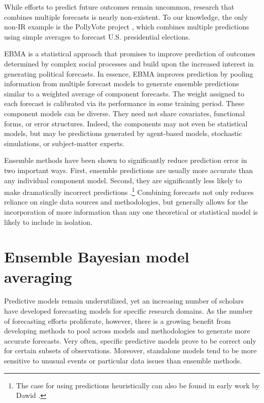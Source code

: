 \documentclass[pdftex,12pt,fullpage,oneside]{amsart}
\begin{document}
While efforts to predict future outcomes remain uncommon, research
that combines multiple forecasts is nearly non-existent.  To our
knowledge, the only non-IR example is the PollyVote project
\citep[c.f.][]{Graefe:2010}, which combines multiple predictions using
simple averages to forecast U.S. presidential elections.

EBMA is a statistical approach that promises to improve prediction of
outcomes determined by complex social processes and build upon the
increased interest in generating political forecasts. In essence, EBMA
improves prediction by pooling information from multiple forecast
models to generate ensemble predictions similar to a weighted average
of component forecasts. The weight assigned to each forecast is
calibrated via its performance in some training period.  These
component models can be diverse.  They need not share covariates,
functional forms, or error structures. Indeed, the components may not
even be statistical models, but may be predictions generated by
agent-based models, stochastic simulations, or subject-matter experts.


Ensemble methods have been shown to significantly reduce prediction
error in two important ways.  First, ensemble predictions are usually
more accurate than any individual component model. Second, they are
significantly less likely to make dramatically incorrect predictions
\citep{Bates:1969, Armstrong:2001, Raftery:2005}.\footnote{The case
  for using predictions heuristically can also be found in early work
  by Dawid \citep{dawid:1982,dawid:1984}.}  Combining forecasts not
only reduces reliance on single data sources and methodologies, but
generally allows for the incorporation of more information than any
one theoretical or statistical model is likely to include in
isolation.


\setcounter{section}{1}

\section{Ensemble Bayesian model averaging} 

Predictive models remain underutilized, yet an increasing number of
scholars have developed forecasting models for specific research
domains.  As the number of forecasting efforts proliferate, however,
there is a growing benefit from developing methods to pool across
models and methodologies to generate more accurate forecasts.  Very
often, specific predictive models prove to be correct only for certain
subsets of observations.  Moreover, standalone models tend to be more
sensitive to unusual events or particular data issues than ensemble
methods.
\end{document}
